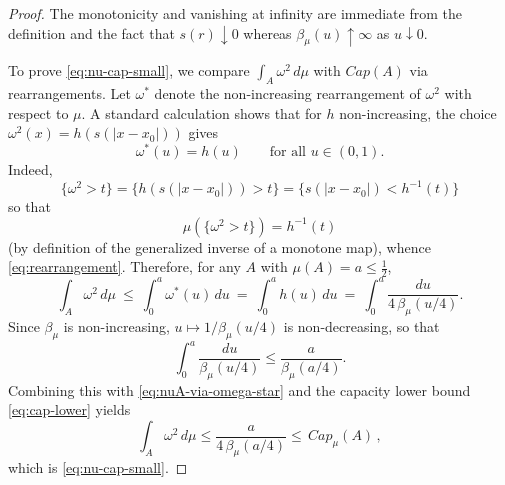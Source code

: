 \documentclass[10pt,a4paper]{amsart}
\begin{document}
\begin{proof}
The monotonicity and vanishing at infinity are immediate from the definition and the fact that $s(r)\downarrow0$ whereas $\beta_\mu(u)\uparrow\infty$ as $u\downarrow0$.

To prove \eqref{eq:nu-cap-small}, we compare $\int_A \omega^2\,d\mu$ with $Cap(A)$ via rearrangements.
Let $\omega^*$ denote the non-increasing rearrangement of $\omega^2$ with respect to $\mu$.
A standard calculation shows that for $h$ non-increasing, the choice $\omega^2(x)=h(s(|x-x_0|))$ gives
\begin{equation}\label{eq:rearrangement}
  \omega^*(u)=h(u)\qquad\text{for all }u\in(0,1). 
\end{equation}
Indeed,
$$
\{\omega^2>t\}=\{h(s(|x-x_0|))>t\}=\{s(|x-x_0|)<h^{-1}(t)\}
$$
so that
$$
\mu(\{\omega^2>t\})=h^{-1}(t)
$$
(by definition of the generalized inverse of a monotone map), whence \eqref{eq:rearrangement}.
Therefore, for any $A$ with $\mu(A)=a\le\tfrac12$,
\begin{equation}\label{eq:nuA-via-omega-star}
  \int_A \omega^2\,d\mu \ \le\ \int_0^{a} \omega^*(u)\,du \ =\ \int_0^{a} h(u)\,du
  \ =\ \int_0^{a} \frac{du}{4\,\beta_\mu(u/4)}.
\end{equation}
Since $\beta_\mu$ is non-increasing, $u\mapsto 1/\beta_\mu(u/4)$ is non-decreasing, so that
$$
\int_0^{a} \frac{du}{\beta_\mu(u/4)} \le \frac{a}{\beta_\mu(a/4)}.
$$
Combining this with \eqref{eq:nuA-via-omega-star} and the capacity lower bound \eqref{eq:cap-lower} yields
$$
\int_A \omega^2\,d\mu \le \frac{a}{4\,\beta_\mu(a/4)} \le \, Cap_\mu(A) \, ,
$$ which is \eqref{eq:nu-cap-small}.
\end{proof}
\end{document}
